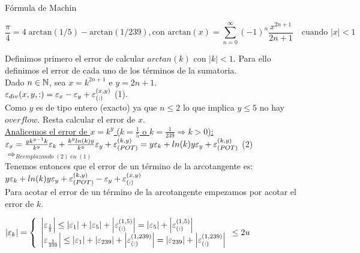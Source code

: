 \begin{subsection}{Fórmula de Machin}

	\begin{equation*}
		\frac{\pi}{4} = 4 \; \mathrm{arctan}(1/5) - \mathrm{arctan}(1/239), \text{con } \mathrm{arctan}(x) = \sum_{n=0}^{\infty} \left(-1\right)^n \frac{x^{2n+1}}{2n+1} \quad \text{cuando } \left|x\right|<1
    \end{equation*}
	
	Definimos primero el error de calcular $arctan(k)$ con $|k|<1$. Para ello definimos el error de cada uno de los términos de la sumatoria.\\
	
	Dado $n \in \mathbb{N}$, sea $x=k^{2n+1}$ e $y=2n+1$.\\
	
	$\varepsilon _{div}({x,y,:}) = \varepsilon _{x} - \varepsilon _{y} + \varepsilon _{({:})}^{({x,y})}$ (1).\\
	
	Como $y$ es de tipo entero (exacto) ya que $n \leq 2$ lo que implica $y \leq 5$ no hay $overflow$. Resta calcular el error de $x$.\\
	
	\underline{Analicemos el error de $x=k^y$ ($k=\frac{1}{5}$ o $k=\frac{1}{239} \Rightarrow k>0$):}\\
	
	$\texttt{$\varepsilon _{x}$}=\frac{yk^{y-1}k}{k^y}\varepsilon _{k}+\frac{k^y ln(k) y}{k^y}\varepsilon _{y} + \varepsilon _{({POT})}^{({k,y})} = y\varepsilon _{k} + ln(k) y\varepsilon _{y} + \varepsilon _{({POT})}^{({k,y})}$ (2)\\ 
	
	$\Rightarrow_{Reemplazando \; (2) \; en \; (1)}$\\
	
	Tenemos entonces que el error de un término de la arcotangente es:\\
	
	$y\varepsilon _{k} + ln(k) y\varepsilon _{y} + \varepsilon _{({POT})}^{({k,y})} - \varepsilon _{y} + \varepsilon _{({:})}^{({x,y})}$\\
	
	Para acotar el error de un término de la arcotangente empezamos por acotar el error de $k$.
	
	\pa
	
	$\left|\varepsilon _{k}\right| = \left\{ 
	\begin{array}{l}
	\left|\varepsilon _{\frac{1}{5}}\right| \leq \left|\varepsilon _{1}\right| + \left|\varepsilon _{5}\right| + \left|\varepsilon _{({:})}^{({1,5})}\right| = \left|\varepsilon _{5}\right| + \left|\varepsilon _{({:})}^{({1,5})}\right|\\
	\left|\varepsilon _{\frac{1}{239}}\right| \leq \left|\varepsilon _{1}\right| + \left|\varepsilon _{239}\right| + \left|\varepsilon _{({:})}^{({1,239})}\right| = \left|\varepsilon _{239}\right| + \left|\varepsilon _{({:})}^{({1,239})}\right|\\
	\end{array}
	\leq 2u\\
	\right.$\\
	

\end{subsection}
